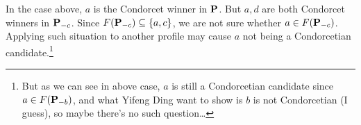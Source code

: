 \begin{center}
\end{center}

In the case above, $a$ is the Condorcet winner in $\mathbf{P}$. But $a,d$ are both Condorcet winners in $\mathbf{P}_{-c}$. Since $F(\mathbf{P}_{-c}) \subseteq \{a,c\}$, we are not sure whether $a \in F(\mathbf{P}_{-c})$. Applying such situation to another profile may cause $a$ not being a Condorcetian candidate.\footnote{But as we can see in above case, $a$ is still a Condorcetian candidate since $a \in F(\mathbf{P}_{-b})$, and what Yifeng Ding want to show is $b$ is not Condorcetian (I guess), so maybe there's no such question\dots}